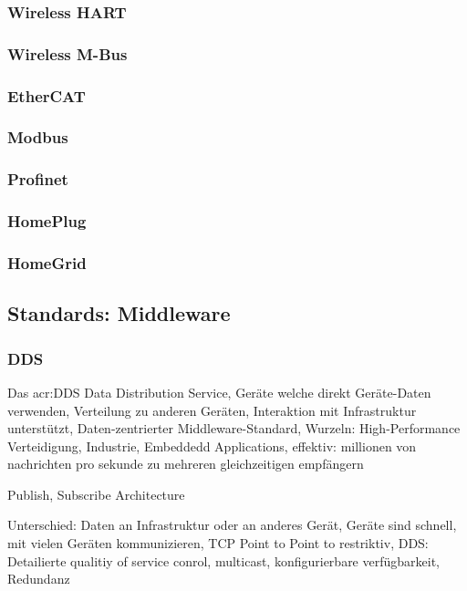 \subsubsection{Wireless HART}

\subsubsection{Wireless M-Bus}

\subsubsection{EtherCAT}

\subsubsection{Modbus}

\subsubsection{Profinet}

\subsubsection{HomePlug}

\subsubsection{HomeGrid}

\subsection{Standards: Middleware}
\subsubsection{DDS}
Das \gls{acr:DDS} 
Data Distribution Service, Geräte welche direkt Geräte-Daten verwenden, Verteilung zu anderen Geräten, Interaktion mit Infrastruktur unterstützt, Daten-zentrierter Middleware-Standard, Wurzeln: High-Performance Verteidigung, Industrie, Embeddedd Applications, effektiv: millionen von nachrichten pro sekunde zu mehreren gleichzeitigen empfängern


Publish, Subscribe Architecture

Unterschied: Daten an Infrastruktur oder an anderes Gerät, Geräte sind schnell, mit vielen Geräten kommunizieren, TCP Point to Point to restriktiv, DDS: Detailierte qualitiy of service conrol, multicast, konfigurierbare verfügbarkeit, Redundanz

